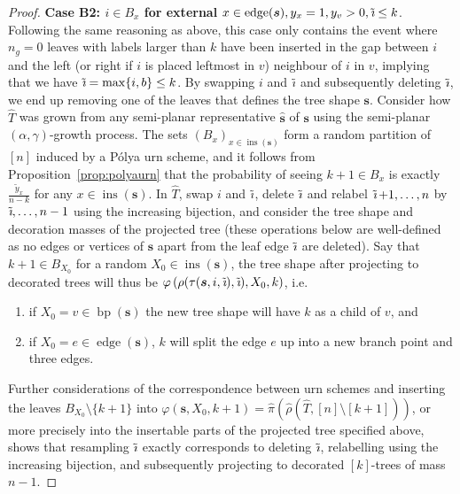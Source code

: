 \documentclass[a4paper, final]{amsart}
\theoremstyle{plain}
\theoremstyle{definition}
\newcommand{\tree}[1][t]{\boldsymbol{#1}}
\newcommand{\that}[1][t]{\hat{\boldsymbol{#1}}} %
\newcommand{\That}[1][T]{\widehat{#1}}
\DeclareMathOperator{\edge}{edge}
\DeclareMathOperator{\insertable}{ins}
\DeclareMathOperator{\branchpoints}{bp}
\newcommand{\insertablef}[1][\tree]{\insertable({\tree[#1]})}
\DeclareMathOperator{\tildei}{\tilde{\textit{\i}}}
\begin{document}
\begin{proof}
\textbf{Case B2: $i \in B_x$ for external} $x \in \edge (\tree[s]), y_x = 1, y_v > 0, \tildei \leq k$.
Following the same reasoning as above, this case only contains the event where $n_g = 0$ leaves with labels larger than $k$ have been inserted in the gap between $i$ and the left (or right if $i$ is placed leftmost in $v$) neighbour of $i$ in $v$, implying that we have $\tildei = \max \{i, b\} \leq k$.
  By swapping $i$ and $\tildei$ and subsequently deleting $\tildei$, we end up removing one of the leaves that defines the tree shape $\tree[s]$.
  Consider how $\That$ was grown from any semi-planar representative $\that[s]$ of $\tree[s]$ using the semi-planar $(\alpha, \gamma)$-growth process.
The sets ${\left( B_x \right)}_{x \in \insertablef[s]}$ form a random partition of $[n]$ induced by a P\'{o}lya urn scheme, and it follows from Proposition~\ref{prop:polyaurn} that the probability of seeing $k+1 \in B_x$ is exactly $\frac{\tilde{y}_x}{n-k}$ for any $x \in \insertablef[s]$.
In $\That$, swap $i$ and $\tildei$, delete $\tildei$ and relabel $\tildei + 1, \ldots, n$ by $\tildei, \ldots, n-1$ using the increasing bijection, and consider the tree shape and decoration masses of the projected tree (these operations below are well-defined as no edges or vertices of $\tree[s]$ apart from the leaf edge $\tildei$ are deleted).
Say that $k+1 \in B_{X_0}$ for a random $X_0 \in \insertablef[s]$, the tree shape after projecting to decorated trees will thus be $\varphi \left( \rho ( \tau ( \tree[s], i, \tildei ), \tildei), X_0, k \right)$, i.e.
  \begin{enumerate}
    \item if $X_0 = v \in \branchpoints (\tree[s])  $ the new tree shape will have $k$ as a child of $v$, and
    \item if $X_0 = e \in \edge (\tree[s])$, $k$ will split the edge $e$ up into a new branch point and three edges.
  \end{enumerate}
Further considerations of the correspondence between urn schemes and inserting the leaves $B_{X_0} \setminus \{k+1\}$ into $\varphi(\tree[s], X_0, k+1) = \hat{\pi} \left( \hat{\rho} (\That, [n] \setminus [k+1]) \right)$, or more precisely into the insertable parts of the projected tree specified above, shows that resampling $\tildei$ exactly corresponds to deleting $\tildei$, relabelling using the increasing bijection, and subsequently projecting to decorated $[k]$-trees of mass $n-1$.


\end{proof}
\end{document}

